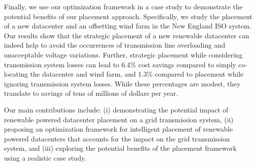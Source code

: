 Finally, we use our optimization framework in a case study to
demonstrate the potential benefits of our placement approach.
Specifically, we study the placement of a new datacenter and an
offsetting wind farm in the New England ISO system.  Our results show
that the strategic placement of a new renewable datacenter can indeed
help to avoid the occurrences of transmission line overloading and
unacceptable voltage variations.  Further, strategic placement while
considering transmission system losses can lead to 6.4\% cost savings
compared to simply co-locating the datacenter and wind farm, and 1.3\%
compared to placement while ignoring transmission system losses.
While these percentages are modest, they translate to savings of tens
of millions of dollars per year.


 Our main contributions include: (i) demonstrating the potential impact of renewable powered datacenter placement on a grid transmission system, (ii) proposing an optimization framework for intelligent placement of renewable powered datacenters that accounts for the impact on the grid transmission system, and (iii) exploring the potential benefits of the placement framework using a realistic case study.

